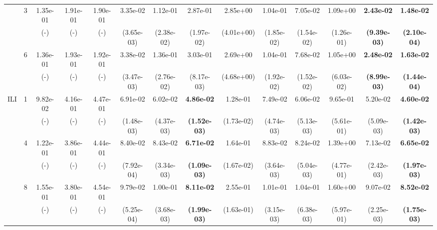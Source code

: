 \begin{table}[!t]
{\begin{tabular}{cccccccccccccc}
    \cmidrule(l){3-14}
     & \multirow{2}{*}{3}& 1.35e-01& 1.91e-01 & 1.90e-01 & 3.35e-02 & 1.12e-01& 2.87e-01& 2.85e+00 & 1.04e-01 & 7.05e-02& 1.09e+00 & \textbf{2.43e-02} & \textbf{1.48e-02}\s \\ 
     &  & (-)& (-) & (-) & (3.65e-03) & (2.38e-02)   & (1.97e-02)          & (4.01e+00) & (1.85e-02) & (1.54e-02) & (1.26e-01) & \textbf{(9.39e-03)} & \textbf{(2.10e-04)} \\
     \cmidrule(l){3-14}
     & \multirow{2}{*}{6}& 1.36e-01& 1.93e-01 & 1.92e-01 & 3.38e-02 & 1.36e-01& 3.03e-01& 2.69e+00 & 1.04e-01 & 7.68e-02& 1.05e+00 & \textbf{2.48e-02} & \textbf{1.63e-02}\s \\ 
     &  & (-)& (-) & (-) & (3.47e-03) & (2.76e-02)   & (8.17e-03)          & (4.68e+00) & (1.92e-02) & (1.52e-02) & (6.03e-02) & \textbf{(8.99e-03)} & \textbf{(1.44e-04)} \\
     \cmidrule(l){2-14}
    \multirow{6}{*}{ILI} & 1& 9.82e-02& 4.16e-01 & 4.47e-01 & 6.91e-02 & 6.02e-02& \textbf{4.86e-02} & 1.28e-01 & 7.49e-02 & 6.06e-02& 9.65e-01 & 5.20e-02& \textbf{4.60e-02}\s \\ 
    &  & (-)& (-) & (-) & (1.48e-03) & (4.37e-03)   & \textbf{(1.52e-03)} & (1.73e-02) & (4.74e-03) & (5.13e-03) & (5.61e-01) & (5.09e-03)          & \textbf{(1.42e-03)} \\
    \cmidrule(l){3-14}
     & \multirow{2}{*}{4}& 1.22e-01& 3.86e-01 & 4.44e-01 & 8.40e-02 & 8.43e-02& \textbf{6.71e-02} & 1.64e-01 & 8.83e-02 & 8.24e-02& 1.39e+00 & 7.13e-02& \textbf{6.65e-02}\s \\ 
     &  & (-)& (-) & (-) & (7.92e-04) & (3.34e-03)   & \textbf{(1.09e-03)} & (1.67e-02) & (3.64e-03) & (5.04e-03) & (4.77e-01) & (2.42e-03)          & \textbf{(1.97e-03)} \\
     \cmidrule(l){3-14}
     & \multirow{2}{*}{8}& 1.55e-01& 3.80e-01 & 4.54e-01 & 9.79e-02 & 1.00e-01& \textbf{8.11e-02}\s & 2.55e-01 & 1.01e-01 & 1.04e-01& 1.60e+00 & 9.07e-02& \textbf{8.52e-02} \\ 
     &  & (-)& (-) & (-) & (5.25e-04) & (3.68e-03)   & \textbf{(1.99e-03)} & (1.63e-01) & (3.15e-03) & (6.38e-03) & (5.97e-01) & (2.25e-03)          & \textbf{(1.75e-03)} \\ 
     \bottomrule
    \end{tabular}}
    \end{table}


